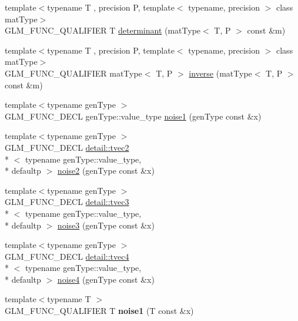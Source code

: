 \begin{DoxyCompactItemize}
\item 
{\footnotesize template$<$typename T , precision P, template$<$ typename, precision $>$ class mat\-Type$>$ }\\G\-L\-M\-\_\-\-F\-U\-N\-C\-\_\-\-Q\-U\-A\-L\-I\-F\-I\-E\-R T \hyperlink{group__core__func__matrix_ga26ea77c574802bc6fc193c40478718d2}{determinant} (mat\-Type$<$ T, P $>$ const \&m)
\item 
{\footnotesize template$<$typename T , precision P, template$<$ typename, precision $>$ class mat\-Type$>$ }\\G\-L\-M\-\_\-\-F\-U\-N\-C\-\_\-\-Q\-U\-A\-L\-I\-F\-I\-E\-R mat\-Type$<$ T, P $>$ \hyperlink{group__core__func__matrix_ga7635d3dbe5aa10ff73a0e6903bf6bea5}{inverse} (mat\-Type$<$ T, P $>$ const \&m)
\item 
{\footnotesize template$<$typename gen\-Type $>$ }\\G\-L\-M\-\_\-\-F\-U\-N\-C\-\_\-\-D\-E\-C\-L gen\-Type\-::value\-\_\-type \hyperlink{group__core__func__noise_gadcbf14e3390990f33fda02bb20836960}{noise1} (gen\-Type const \&x)
\item 
{\footnotesize template$<$typename gen\-Type $>$ }\\G\-L\-M\-\_\-\-F\-U\-N\-C\-\_\-\-D\-E\-C\-L \hyperlink{structglm_1_1detail_1_1tvec2}{detail\-::tvec2}\\*
$<$ typename gen\-Type\-::value\-\_\-type, \\*
defaultp $>$ \hyperlink{group__core__func__noise_ga876ad0805cece7b52bac9f5bac42647a}{noise2} (gen\-Type const \&x)
\item 
{\footnotesize template$<$typename gen\-Type $>$ }\\G\-L\-M\-\_\-\-F\-U\-N\-C\-\_\-\-D\-E\-C\-L \hyperlink{structglm_1_1detail_1_1tvec3}{detail\-::tvec3}\\*
$<$ typename gen\-Type\-::value\-\_\-type, \\*
defaultp $>$ \hyperlink{group__core__func__noise_gadc066dd8e6c25b77a0dd4f59d4a2dd2c}{noise3} (gen\-Type const \&x)
\item 
{\footnotesize template$<$typename gen\-Type $>$ }\\G\-L\-M\-\_\-\-F\-U\-N\-C\-\_\-\-D\-E\-C\-L \hyperlink{structglm_1_1detail_1_1tvec4}{detail\-::tvec4}\\*
$<$ typename gen\-Type\-::value\-\_\-type, \\*
defaultp $>$ \hyperlink{group__core__func__noise_ga4ca7d36395a06c2f210ceca5d9a1d020}{noise4} (gen\-Type const \&x)
\item 
\hypertarget{namespaceglm_a46b13094895146ed855baa444f5b13a2}{{\footnotesize template$<$typename T $>$ }\\G\-L\-M\-\_\-\-F\-U\-N\-C\-\_\-\-Q\-U\-A\-L\-I\-F\-I\-E\-R T {\bfseries noise1} (T const \&x)}\label{namespaceglm_a46b13094895146ed855baa444f5b13a2}


\end{DoxyCompactItemize}
